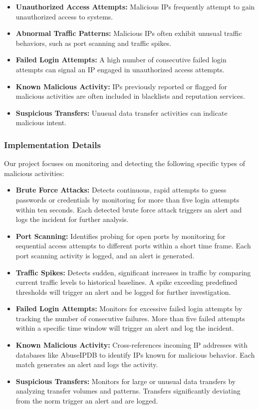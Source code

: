 \documentclass{article}
\begin{document}
    \begin{itemize}
        \item \textbf{Unauthorized Access Attempts:} Malicious IPs frequently attempt to gain unauthorized access to systems.
        \item \textbf{Abnormal Traffic Patterns:} Malicious IPs often exhibit unusual traffic behaviors, such as port scanning and traffic spikes.
        \item \textbf{Failed Login Attempts:} A high number of consecutive failed login attempts can signal an IP engaged in unauthorized access attempts.
        \item \textbf{Known Malicious Activity:} IPs previously reported or flagged for malicious activities are often included in blacklists and reputation services.
        \item \textbf{Suspicious Transfers:} Unusual data transfer activities can indicate malicious intent.
    \end{itemize}

    \subsubsection{Implementation Details}\label{subsubsec:implementation-details}

    Our project focuses on monitoring and detecting the following specific types of malicious activities:

    \begin{itemize}
        \item \textbf{Brute Force Attacks:} Detects continuous, rapid attempts to guess passwords or credentials by monitoring for more than five login attempts within ten seconds.
        Each detected brute force attack triggers an alert and logs the incident for further analysis.
        \item \textbf{Port Scanning:} Identifies probing for open ports by monitoring for sequential access attempts to different ports within a short time frame.
        Each port scanning activity is logged, and an alert is generated.
        \item \textbf{Traffic Spikes:} Detects sudden, significant increases in traffic by comparing current traffic levels to historical baselines.
        A spike exceeding predefined thresholds will trigger an alert and be logged for further investigation.
        \item \textbf{Failed Login Attempts:} Monitors for excessive failed login attempts by tracking the number of consecutive failures.
        More than five failed attempts within a specific time window will trigger an alert and log the incident.
        \item \textbf{Known Malicious Activity:} Cross-references incoming IP addresses with databases like AbuseIPDB to identify IPs known for malicious behavior.
        Each match generates an alert and logs the activity.
        \item \textbf{Suspicious Transfers:} Monitors for large or unusual data transfers by analyzing transfer volumes and patterns.
        Transfers significantly deviating from the norm trigger an alert and are logged.
    \end{itemize}
\end{document}
